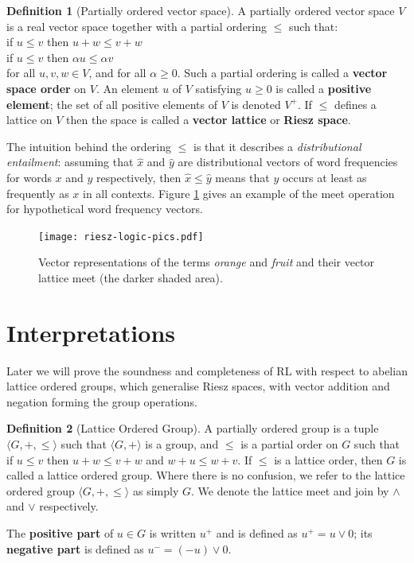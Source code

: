 \documentclass[journal,draftcls,onecolumn]{IEEEtran}
\theoremstyle{definition}
\newtheorem{definition}{Definition}
\begin{document}
\begin{definition}[Partially ordered vector space]
A partially ordered vector space $V$ is a real vector space together with a partial ordering $\le$ such that:
\vspace{0.1cm}\\
\indent if $u \le v$ then $u + w \le v + w$\\
\indent if $u \le v$ then $\alpha u \le \alpha v$
\vspace{0.1cm}\\
for all $u,v,w \in V$, and for all $\alpha \ge 0$. Such a partial ordering is called a \textbf{vector space order} on $V$. An element $u$ of $V$ satisfying $u \ge 0$ is called a \textbf{positive element}; the set of all positive elements of $V$ is denoted $V^+$. If $\le$ defines a lattice on $V$ then the space is called a \textbf{vector lattice} or \textbf{Riesz space}.
\end{definition}

The intuition behind the ordering $\le$ is that it describes a
\emph{distributional entailment}: assuming that $\hat{x}$ and
$\hat{y}$ are distributional vectors of word frequencies for words $x$
and $y$ respectively, then $\hat{x} \le \hat{y}$ means that $y$ occurs
at least as frequently as $x$ in all contexts. Figure
\ref{fig:orangefruit} gives an example of the meet operation for
hypothetical word frequency vectors.

\begin{figure}
\begin{center}
\texttt{[image: riesz-logic-pics.pdf]}
\caption{Vector representations of the terms \emph{orange} and
  \emph{fruit} and their vector lattice meet (the darker shaded
  area).}
\label{fig:orangefruit}
\end{center}
\end{figure}


\section{Interpretations}

Later we will prove the soundness and completeness of RL with respect
to abelian lattice ordered groups, which generalise Riesz spaces, with
vector addition and negation forming the group operations.

\begin{definition}[Lattice Ordered Group]
  A partially ordered group is a tuple $\langle G, +, \le\rangle$ such
  that $\langle G, +\rangle$ is a group, and $\le$ is a partial order
  on $G$ such that if $u \le v$ then $u + w \le v + w$ and $w + u \le
  w + v$. If $\le$ is a lattice order, then $G$ is called a lattice
  ordered group. Where there is no confusion, we refer to the lattice
  ordered group $\langle G, +, \le\rangle$ as simply $G$. We denote
  the lattice meet and join by $\land$ and $\lor$ respectively.

  The \textbf{positive part} of $u\in G$ is written $u^+$ and is defined
  as $u^+ = u\lor 0$; its \textbf{negative part} is defined as $u^- =
  (-u)\lor 0$.
\end{definition}
\end{document}
